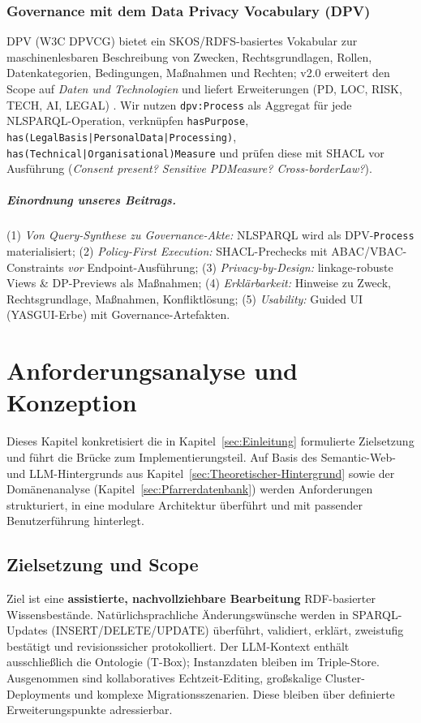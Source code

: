 \subsection{Governance mit dem Data Privacy Vocabulary (DPV)}
DPV (W3C DPVCG) bietet ein SKOS/RDFS-basiertes Vokabular zur maschinenlesbaren Beschreibung von Zwecken, Rechtsgrundlagen, Rollen, Datenkategorien, Bedingungen, Maßnahmen und Rechten; v2.0 erweitert den Scope auf \emph{Daten und Technologien} und liefert Erweiterungen (PD, LOC, RISK, TECH, AI, LEGAL) \cite{dpv2024w3c}. 
Wir nutzen \texttt{dpv:Process} als Aggregat für jede NL{\textrightarrow}SPARQL-Operation, verknüpfen \texttt{hasPurpose}, \texttt{has(LegalBasis|PersonalData|Processing)}, \texttt{has(Technical|Organisational)Measure} und prüfen diese mit SHACL vor Ausführung (\emph{Consent present? Sensitive PD{\textrightarrow}Measure? Cross-border{\textrightarrow}Law?}).

\paragraph{Einordnung unseres Beitrags.}
(1) \emph{Von Query-Synthese zu Governance-Akte:} NL{\textrightarrow}SPARQL wird als DPV-\texttt{Process} materialisiert; (2) \emph{Policy-First Execution:} SHACL-Prechecks mit ABAC/VBAC-Constraints \emph{vor} Endpoint-Ausführung; (3) \emph{Privacy-by-Design:} linkage-robuste Views \& DP-Previews als Maßnahmen; (4) \emph{Erklärbarkeit:} Hinweise zu Zweck, Rechtsgrundlage, Maßnahmen, Konfliktlösung; (5) \emph{Usability:} Guided UI (YASGUI-Erbe) mit Governance-Artefakten.




\chapter{Anforderungsanalyse und Konzeption}
\label{sec:anforderungsanalyse-konzeption}

Dieses Kapitel konkretisiert die in Kapitel~\ref{sec:Einleitung} formulierte Zielsetzung und führt die Brücke zum Implementierungsteil. Auf Basis des Semantic-Web- und LLM-Hintergrunds aus Kapitel~\ref{sec:Theoretischer-Hintergrund} sowie der Domänenanalyse (Kapitel~\ref{sec:Pfarrerdatenbank}) werden Anforderungen strukturiert, in eine modulare Architektur überführt und mit passender Benutzerführung hinterlegt.

\section{Zielsetzung und Scope}
Ziel ist eine \textbf{assistierte, nachvollziehbare Bearbeitung} RDF-basierter Wissensbestände. Natürlichsprachliche Änderungswünsche werden in SPARQL-Updates (INSERT/DELETE/UPDATE) überführt, validiert, erklärt, zweistufig bestätigt und revisionssicher protokolliert. Der LLM-Kontext enthält ausschließlich die Ontologie (T-Box); Instanzdaten bleiben im Triple-Store. Ausgenommen sind kollaboratives Echtzeit-Editing, großskalige Cluster-Deployments und komplexe Migrationsszenarien. Diese bleiben über definierte Erweiterungspunkte adressierbar.

